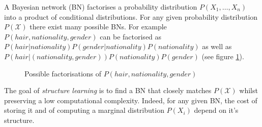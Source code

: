 \documentclass[runningheads]{llncs}
\begin{document}
A Bayesian network (BN) factorises a probability distribution $P(X_1, \dots, X_n)$ into a product of conditional distributions. For any given probability distribution $P(\mathcal{X})$ there exist many possible BNs. For example $P(hair, nationality, gender)$ can be factorised as $P(hair | nationality) P(gender | nationality) P(nationality)$ as well as $P(hair | (nationality, gender))P(nationality)P(gender)$ (see figure \ref{fig:example-networks}).

\begin{figure}[H]
\begin{subfigure}{.5\textwidth}
  \centering
\end{subfigure}%
\begin{subfigure}{.5\textwidth}
  \centering
\end{subfigure}
\caption{Possible factorisations of $P(hair, nationality, gender)$}
\label{fig:example-networks}
\end{figure}

The goal of \emph{structure learning} is to find a BN that closely matches $P(\mathcal{X})$ whilst preserving a low computational complexity. Indeed, for any given BN, the cost of storing it and of computing a marginal distribution $P(X_i)$ depend on it's structure.
\end{document}
